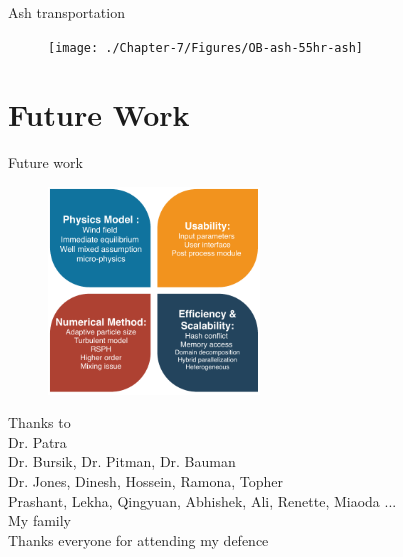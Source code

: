 \documentclass{beamer}
\begin{document}
\begin{frame}{Ash transportation}
\begin{figure}[!htb]
\begin{minipage}{.288\textwidth}
    \end{minipage}%
    \begin{minipage}{.288\textwidth}
        \centering
        \texttt{[image: ./Chapter-7/Figures/OB-ash-55hr-ash]}
    \end{minipage}%
\end{figure}
\end{frame}

\section{Future Work}
\begin{frame} {Future work}
\begin{figure}
	\includegraphics[width=0.5\textwidth]{./PPT/Future-Work}
\end{figure}
\end{frame}
%
\begin{frame}{}
\center
\huge{
Thanks to \\}
\Large
{
Dr. Patra \\
Dr. Bursik, Dr. Pitman, Dr. Bauman \\
Dr. Jones, Dinesh, Hossein, Ramona, Topher \\
Prashant, Lekha, Qingyuan, Abhishek, Ali, Renette, Miaoda ...\\
My family \\
Thanks everyone for attending my defence
}
\end{frame}
\end{document}
